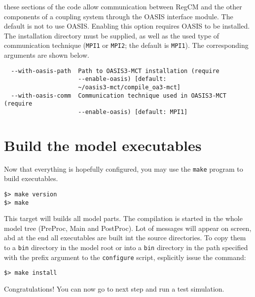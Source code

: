 \begin{enumerate}
these sections of the code allow communication between RegCM and the other
components of a coupling system through the OASIS interface module. The default
is not to use OASIS.
Enabling this option requires OASIS to be installed. The installation directory
must be supplied, as well as the used type of communication technique
(\verb=MPI1= or \verb=MPI2=; the default is \verb=MPI1=).
The corresponding arguments are shown below.
\begin{verbatim}
  --with-oasis-path  Path to OASIS3-MCT installation (require
                     --enable-oasis) [default:
                     ~/oasis3-mct/compile_oa3-mct]
  --with-oasis-comm  Communication technique used in OASIS3-MCT (require
                     --enable-oasis) [default: MPI1]
\end{verbatim}
\end{enumerate}

\section{Build the model executables}

Now that everything is hopefully configured, you may use the \verb=make=
program to build executables.

\begin{Verbatim}
$> make version
$> make
\end{Verbatim}

This target will builds all model parts. 
The compilation is started in the whole model tree (PreProc, Main and PostProc).
Lot of messages will appear on screen, abd at the end all executables are built
int the source directories.
To copy them to a \verb=bin= directory in the model root or into a \verb=bin=
directory in the path specified with the prefix argument to the \verb=configure=
script, esplicitly issue the command:

\begin{Verbatim}
$> make install
\end{Verbatim}

Congratulations! You can now go to next step and run a test simulation.
